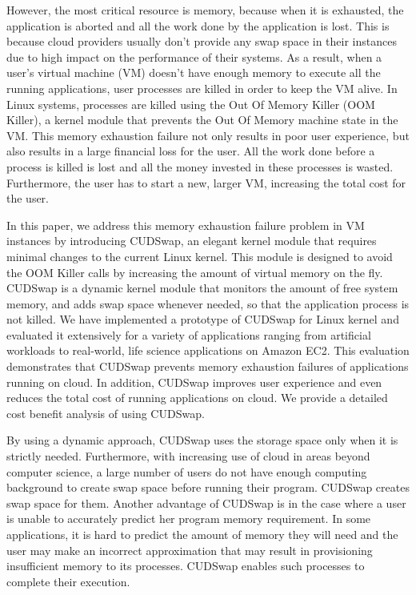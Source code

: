 However, the most critical resource is memory, because when it is exhausted,
the application is aborted and all the work done by the application is lost.
This is because cloud providers usually don't provide any swap space in
their instances due to high impact on the performance of
their systems. As a result, when a user's virtual machine (VM) doesn't have
enough memory to execute all the running applications, user processes are
killed in order to keep the VM alive. In Linux systems, processes are
killed using the Out Of Memory Killer (OOM Killer), a kernel module that
prevents the Out Of Memory machine state in the VM. This memory exhaustion
failure not only results in poor user experience, but also results in a large
financial loss for the user. All the work done before a process is killed is
lost and all the money invested in these processes
is wasted. Furthermore, the user has to start a new, larger VM, increasing
the total cost for the user.

In this paper, we address this memory exhaustion failure problem in VM
instances by introducing CUDSwap, an elegant kernel module that requires
minimal changes to the current Linux kernel. This module is designed to
avoid the OOM Killer calls by increasing the amount of virtual memory on
the fly. CUDSwap is a dynamic kernel module that monitors the amount of
free system memory, and adds swap space whenever needed, so that the
application process is not killed. We have implemented a prototype of
CUDSwap for Linux kernel and evaluated it extensively for a variety of
applications ranging from artificial workloads to real-world, life science
applications on Amazon EC2. This evaluation demonstrates that CUDSwap
prevents memory exhaustion failures of applications running on cloud. In
addition, CUDSwap improves user experience and even reduces the total
cost of running applications on cloud. We provide a detailed cost benefit
analysis of using CUDSwap.

By using a dynamic approach, CUDSwap uses the storage space only when it
is strictly needed. Furthermore, with increasing use of cloud in areas
beyond computer science, a large number of users do not have enough
computing background to create swap space before running their program.
CUDSwap creates swap space for them. Another advantage of CUDSwap is in
the case where a user is unable to accurately predict her program memory
requirement. In some applications, it is hard to predict the amount of
memory they will need and the user may make an incorrect approximation
that may result in provisioning insufficient memory to its processes.
CUDSwap enables such processes to complete their execution.

